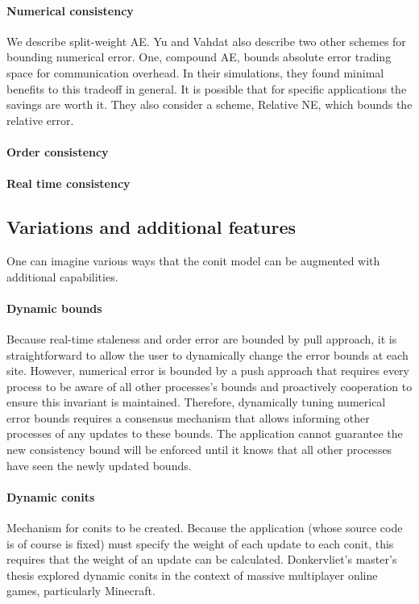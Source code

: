 \documentclass[]             %
{NASA}                       %
\theoremstyle{definition}
\begin{document}
\paragraph{Numerical consistency}
\label{numerical-consistency-1}
We describe split-weight AE. Yu and Vahdat also describe two other
schemes for bounding numerical error. One, compound AE, bounds absolute
error trading space for communication overhead. In their simulations,
they found minimal benefits to this tradeoff in general. It is possible
that for specific applications the savings are worth it. They also
consider a scheme, Relative NE, which bounds the relative error.

\paragraph{Order consistency}
\label{order-consistency-1}

\paragraph{Real time consistency}
\label{real-time-consistency-1}

\subsection{Variations and additional features}

One can imagine various ways that the conit model can be augmented
with additional capabilities.

\paragraph{Dynamic bounds}
Because real-time staleness and order error are bounded by pull
approach, it is straightforward to allow the user to dynamically
change the error bounds at each site. However, numerical error is
bounded by a push approach that requires every process to be aware of
all other processes's bounds and proactively cooperation to ensure
this invariant is maintained. Therefore, dynamically tuning numerical
error bounds requires a consensus mechanism that allows informing
other processes of any updates to these bounds. The application cannot
guarantee the new consistency bound will be enforced until it knows
that all other processes have seen the newly updated bounds.

\paragraph{Dynamic conits}
Mechanism for conits to be created. Because the application (whose
source code is of course is fixed) must specify the weight of each
update to each conit, this requires that the weight of an update can
be calculated. Donkervliet's master's thesis \citationneeded explored
dynamic conits in the context of massive multiplayer online games,
particularly Minecraft.
\end{document}
